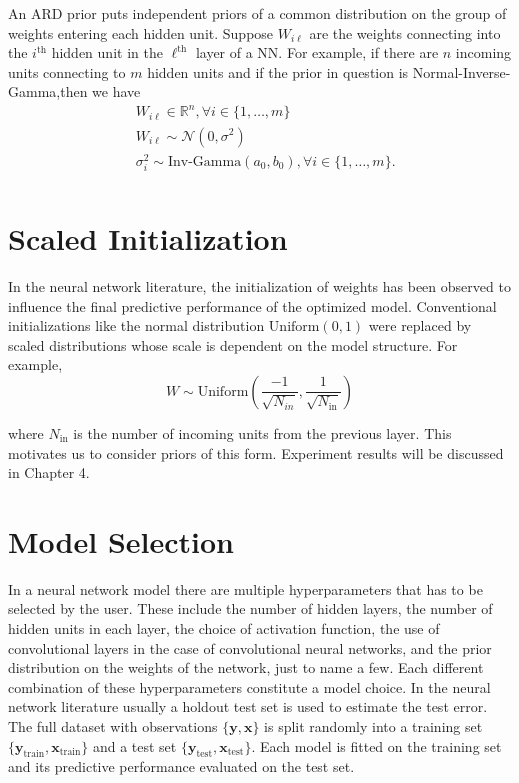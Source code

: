 \documentclass[12pt]{report}
\begin{document}
An ARD prior puts independent priors of a common distribution on the group of weights entering each hidden unit.
Suppose $W_{i\ell}$ are the weights connecting into the $i^\text{th}$ hidden unit in the $\ell^\text{th}$ layer of a NN. For example, if there are $n$ incoming units connecting to $m$ hidden units and if the prior in question is Normal-Inverse-Gamma,then we have 
\begin{align*}
& W_{i\ell} \in \mathbb{R}^n , \forall i \in \{1,\dots,m\}\\ 
& W_{i\ell} \sim \mathcal{N}(0,\sigma^2) \\
& \sigma_i^2  \sim \text{Inv-Gamma}(a_0,b_0), \forall i \in \{1,\dots,m\} . \\
\end{align*}
\section{Scaled Initialization}
In the neural network literature, the initialization of weights has been observed to influence the final predictive performance of the optimized model. Conventional initializations like the normal distribution $\text{Uniform}(0,1) $ were replaced by scaled distributions whose scale is dependent on the model structure. For example,
\[ W \sim \text{Uniform}(\frac{-1}{\sqrt{N_{in}}},\frac{1}{\sqrt{N_{\text{in}}}}) \]

where $N_\text{in}$ is the number of incoming units from the previous layer. This motivates us to consider priors of this form. Experiment results will be discussed in Chapter 4.
\section{Model Selection}
In a neural network model there are multiple hyperparameters that has to be selected by
the user. These include the number of hidden layers, the number of hidden
units in each layer, the choice of activation function, the use of
convolutional layers in the case of convolutional neural networks, and the prior
distribution on the weights of the network, just to name a few. Each different combination of these
hyperparameters constitute a model choice. In the neural network literature
usually a holdout test set is used to estimate the test error. The full dataset with observations
$\{\textbf{y},\textbf{x}\}$ is split randomly into a training set
$\{\textbf{y}_{\text{train}}, \textbf{x}_{\text{train}}\}$ and a test set $\{\textbf{y}_{\text{test}},
\textbf{x}_{\text{test}} \}$. Each model is fitted on the training set and its predictive
performance evaluated on the test set.
\end{document}
